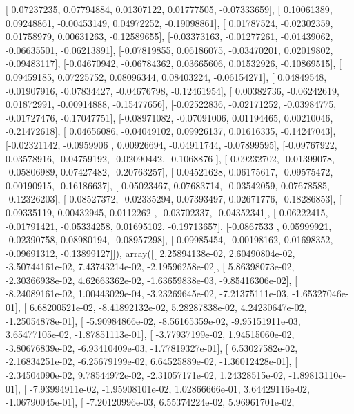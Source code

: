 \documentclass{article}
\begin{document}
       [ 0.07237235,  0.07794884,  0.01307122,  0.01777505, -0.07333659],
       [ 0.10061389,  0.09248861, -0.00453149,  0.04972252, -0.19098861],
       [ 0.01787524, -0.02302359,  0.01758979,  0.00631263, -0.12589655],
       [-0.03373163, -0.01277261, -0.01439062, -0.06635501, -0.06213891],
       [-0.07819855,  0.06186075, -0.03470201,  0.02019802, -0.09483117],
       [-0.04670942, -0.06784362,  0.03665606,  0.01532926, -0.10869515],
       [ 0.09459185,  0.07225752,  0.08096344,  0.08403224, -0.06154271],
       [ 0.04849548, -0.01907916, -0.07834427, -0.04676798, -0.12461954],
       [ 0.00382736, -0.06242619,  0.01872991, -0.00914888, -0.15477656],
       [-0.02522836, -0.02171252, -0.03984775, -0.01727476, -0.17047751],
       [-0.08971082, -0.07091006,  0.01194465,  0.00210046, -0.21472618],
       [ 0.04656086, -0.04049102,  0.09926137,  0.01616335, -0.14247043],
       [-0.02321142, -0.0959906 ,  0.00926694, -0.04911744, -0.07899595],
       [-0.09767922,  0.03578916, -0.04759192, -0.02090442, -0.1068876 ],
       [-0.09232702, -0.01399078, -0.05806989,  0.07427482, -0.20763257],
       [-0.04521628,  0.06175617, -0.09575472,  0.00190915, -0.16186637],
       [ 0.05023467,  0.07683714, -0.03542059,  0.07678585, -0.12326203],
       [ 0.08527372, -0.02335294,  0.07393497,  0.02671776, -0.18286853],
       [ 0.09335119,  0.00432945,  0.0112262 , -0.03702337, -0.04352341],
       [-0.06222415, -0.01791421, -0.05334258,  0.01695102, -0.19713657],
       [-0.0867533 ,  0.05999921, -0.02390758,  0.08980194, -0.08957298],
       [-0.09985454, -0.00198162,  0.01698352, -0.09691312, -0.13899127]]), array([[  2.25894138e-02,   2.60490804e-02,  -3.50744161e-02,
          7.43743214e-02,  -2.19596258e-02],
       [  5.86398073e-02,  -2.30366938e-02,   4.62663362e-02,
         -1.63659838e-03,  -9.85416306e-02],
       [ -8.24089161e-02,   1.00443029e-04,  -3.23269645e-02,
         -7.21375111e-03,  -1.65327046e-01],
       [  6.68200521e-02,  -8.41892132e-02,   5.28287838e-02,
          4.24230647e-02,  -1.25054878e-01],
       [ -5.90984866e-02,  -8.56165359e-02,  -9.95151911e-03,
          3.65477105e-02,  -1.87851113e-01],
       [ -3.77937199e-02,   1.94515060e-02,  -3.80676839e-02,
         -6.93410409e-03,  -1.77819327e-01],
       [  6.53027582e-02,  -2.16834251e-02,  -6.25679199e-02,
          6.64525889e-02,  -1.36012428e-01],
       [ -2.34504090e-02,   9.78544972e-02,  -2.31057171e-02,
          1.24328515e-02,  -1.89813110e-01],
       [ -7.93994911e-02,  -1.95908101e-02,   1.02866666e-01,
          3.64429116e-02,  -1.06790045e-01],
       [ -7.20120996e-03,   6.55374224e-02,   5.96961701e-02,
\end{document}
